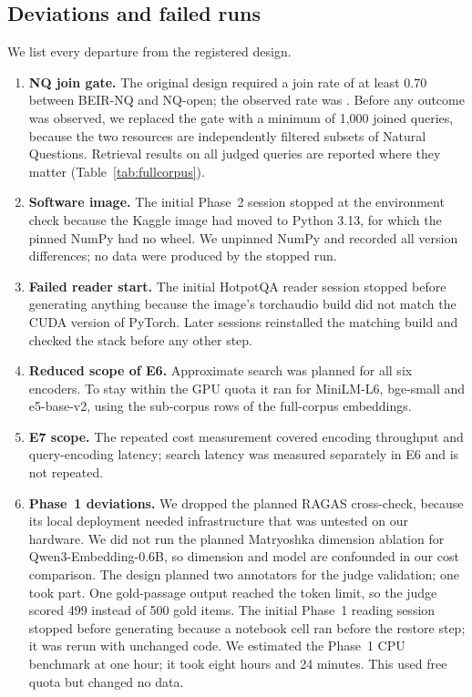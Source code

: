 \subsection{Deviations and failed runs}\label{sec:deviations}
We list every departure from the registered design.
\begin{enumerate}
\item \textbf{NQ join gate.} The original design required a join rate of at least 0.70 between BEIR-NQ and NQ-open; the observed rate was . Before any outcome was observed, we replaced the gate with a minimum of 1,000 joined queries, because the two resources are independently filtered subsets of Natural Questions. Retrieval results on all  judged queries are reported where they matter (Table~\ref{tab:fullcorpus}).
\item \textbf{Software image.} The initial Phase~2 session stopped at the environment check because the Kaggle image had moved to Python 3.13, for which the pinned NumPy had no wheel. We unpinned NumPy and recorded all version differences; no data were produced by the stopped run.
\item \textbf{Failed reader start.} The initial HotpotQA reader session stopped before generating anything because the image's torchaudio build did not match the CUDA version of PyTorch. Later sessions reinstalled the matching build and checked the stack before any other step.
\item \textbf{Reduced scope of E6.} Approximate search was planned for all six encoders. To stay within the GPU quota it ran for MiniLM-L6, bge-small and e5-base-v2, using the sub-corpus rows of the full-corpus embeddings.
\item \textbf{E7 scope.} The repeated cost measurement covered encoding throughput and query-encoding latency; search latency was measured separately in E6 and is not repeated.
\item \textbf{Phase~1 deviations.} We dropped the planned RAGAS cross-check, because its local deployment needed infrastructure that was untested on our hardware. We did not run the planned Matryoshka dimension ablation for Qwen3-Embedding-0.6B, so dimension and model are confounded in our cost comparison. The design planned two annotators for the judge validation; one took part. One gold-passage output reached the token limit, so the judge scored 499 instead of 500 gold items. The initial Phase~1 reading session stopped before generating because a notebook cell ran before the restore step; it was rerun with unchanged code. We estimated the Phase~1 CPU benchmark at one hour; it took eight hours and 24 minutes. This used free quota but changed no data.

\end{enumerate}
